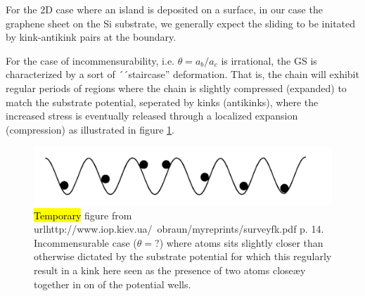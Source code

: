 For the 2D case where an island is deposited on a surface, in our case the graphene sheet on the Si substrate, we generally expect the sliding to be initated by kink-antikink pairs at the boundary. 


For the case of incommensurability, i.e. $\theta = a_b/a_c$ is irrational, the
GS is characterized by a sort of ´´staircase'' deformation. That is, the chain
will exhibit regular periods of regions where the chain is slightly compressed
(expanded) to match the substrate potential, seperated by kinks (antikinks),
where the increased stress is eventually released through a localized expansion
(compression) as illustrated in figure \ref{fig:incommensurable_example}.

\begin{figure}[H]
  \centering
  \includegraphics[width=0.5\linewidth]{figures/theory/incommensurable_example.png}
  \caption{\hl{Temporary} figure from
  url{http://www.iop.kiev.ua/~obraun/myreprints/surveyfk.pdf} p. 14.
  Incommensurable case ($\theta = ?$) where atoms sits slightly closer than
  otherwise dictated by the substrate potential for which this regularly result
  in a kink here seen as the presence of two atoms closeæy together in on of the
  potential wells.}
  \label{fig:incommensurable_example}
\end{figure}

